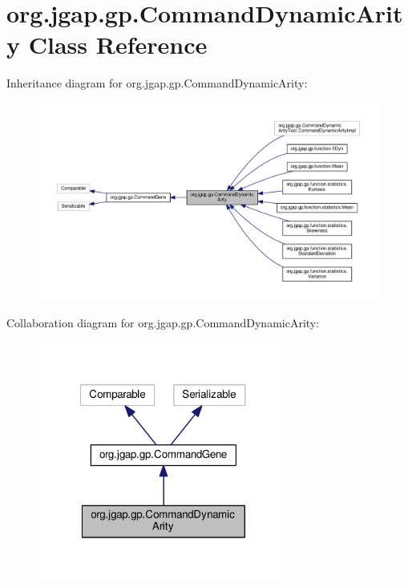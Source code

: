 \hypertarget{classorg_1_1jgap_1_1gp_1_1_command_dynamic_arity}{\section{org.\-jgap.\-gp.\-Command\-Dynamic\-Arity Class Reference}
\label{classorg_1_1jgap_1_1gp_1_1_command_dynamic_arity}
}


Inheritance diagram for org.\-jgap.\-gp.\-Command\-Dynamic\-Arity\-:
\nopagebreak
\begin{figure}[H]
\begin{center}
\leavevmode
\includegraphics[width=350pt]{classorg_1_1jgap_1_1gp_1_1_command_dynamic_arity__inherit__graph}
\end{center}
\end{figure}


Collaboration diagram for org.\-jgap.\-gp.\-Command\-Dynamic\-Arity\-:
\nopagebreak
\begin{figure}[H]
\begin{center}
\leavevmode
\includegraphics[width=233pt]{classorg_1_1jgap_1_1gp_1_1_command_dynamic_arity__coll__graph}
\end{center}
\end{figure}
